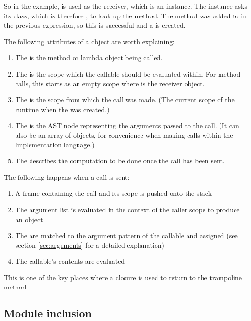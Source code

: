 So in the example,  is used as the receiver, which is an  instance. The instance asks its class, which is therefore , to look up the method. The method was added to  in the previous expression, so this is successful and a  is created.

The following attributes of a  object are worth explaining:

\begin{enumerate}
  \item The  is the method or lambda object being called.
  \item The  is the scope which the callable should be evaluated within. For method calls, this starts as an empty scope where  is the receiver object.
  \item The  is the scope from which the call was made. (The current scope of the runtime when the  was created.)
  \item The  is the  AST node representing the arguments passed to the call. (It can also be an array of objects, for convenience when making calls within the implementation language.)
  \item The  describes the computation to be done once the call has been sent.
\end{enumerate}

The following happens when a call is sent:

\begin{enumerate}
  \item A frame containing the call and its scope is pushed onto the stack
  \item The argument list is evaluated in the context of the caller scope to produce an  object
  \item The  are matched to the argument pattern of the callable and assigned (see section \ref{sec:arguments} for a detailed explanation)
  \item The callable's contents are evaluated
\end{enumerate}

This is one of the key places where a closure is used to return to the trampoline method.

\subsection{Module inclusion}
\label{sec:module_inclusion}


